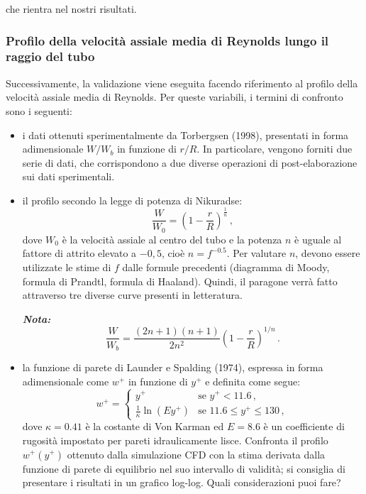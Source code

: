 che rientra nel nostri risultati.

\subsubsection*{Profilo della velocità assiale media di Reynolds lungo il raggio del tubo}

Successivamente, la validazione viene eseguita facendo riferimento al profilo della velocità assiale media di Reynolds. Per queste variabili, i termini di confronto sono i seguenti:
\begin{itemize}
    \item i dati ottenuti sperimentalmente da Torbergsen (1998), presentati in forma adimensionale \(W/W_b\) in funzione di \(r/R\). In particolare, vengono forniti due serie di dati, che corrispondono a due diverse operazioni di post-elaborazione sui dati sperimentali.

    \item il profilo secondo la legge di potenza di Nikuradse:
    \[
    \frac{W}{W_0} = \left(1 - \frac{r}{R}\right)^{\frac{1}{n}}\,,
    \]
    dove \(W_0\) è la velocità assiale al centro del tubo e la potenza \(n\) è uguale al fattore di attrito elevato a \( -0,5\), cioè \(n = f^{-0.5}\). Per valutare \(n\), devono essere utilizzate le stime di \(f\) dalle formule precedenti (diagramma di Moody, formula di Prandtl, formula di Haaland). Quindi, il paragone verrà fatto attraverso tre diverse curve presenti in letteratura.

    \emph{\textbf{Nota:}}
    \begin{equation*}
    \frac{W}{W_b}=\frac{(2n+1)(n+1)}{2n^2} \left( 1- \frac{r}{R}  \right)^{1/n}\,.
    \end{equation*}

    \item la funzione di parete di Launder e Spalding (1974), espressa in forma adimensionale come \(w^+\) in funzione di \(y^+\) e definita come segue:
    \[
    w^+ =
    \begin{cases} 
        y^+ & \text{se } y^+ < 11.6\,, \\
        \frac{1}{\kappa} \ln(Ey^+) & \text{se } 11.6 \leq y^+ \leq 130\,,
    \end{cases}
    \]
    dove \(\kappa = 0.41\) è la costante di Von Karman ed \(E = 8.6\) è un coefficiente di rugosità impostato per pareti idraulicamente lisce. Confronta il profilo \(w^+(y^+)\) ottenuto dalla simulazione CFD con la stima derivata dalla funzione di parete di equilibrio nel suo intervallo di validità; si consiglia di presentare i risultati in un grafico log-log. Quali considerazioni puoi fare?
\end{itemize}

